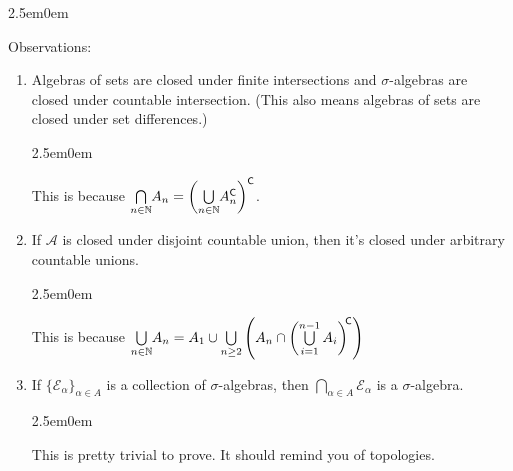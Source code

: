\documentclass{book}
\newcommand{\hTwo}{%
\color{MidnightBlue}%
   \fontsize{13}{15}\selectfont%
}
\newcommand{\hThree}{%
   \color{PineGreen!85!Orange}
   \fontsize{12}{14}\selectfont%
}
\newcommand{\exOne}{%
   \color{Purple}%
   \fontsize{13}{15}\selectfont%
}
\newenvironment{myIndent}{%
   \begin{adjustwidth}{2.5em}{0em}%
}{%
   \end{adjustwidth}%
}
\newcommand{\comp}{\mathsf{C}}
\newcommand{\retTwo}{\hfill\bigbreak}
\begin{document}
\begin{myIndent}\hTwo
   Observations:
   \begin{enumerate}
      \item Algebras of sets are closed under finite intersections and $\sigma$-algebras are\\ closed under countable intersection. (This also means algebras of sets are closed under set differences.)
      
      \begin{myIndent}\hThree
         This is because $\bigcap\limits_{n \in \mathbb{N}}\hspace{-0.2em}A_n = \left(\bigcup\limits_{n \in \mathbb{N}}\hspace{-0.2em}A_n^\comp\right)^\comp$\hspace{-0.4em}.
      \end{myIndent}

      \item If $\mathcal{A}$ is closed under disjoint countable union, then it's closed under arbitrary countable unions.
      
      \begin{myIndent}\hThree
         This is because $\bigcup\limits_{n \in \mathbb{N}}\hspace{-0.2em}A_n = A_1 \cup \bigcup\limits_{n \geq 2}\left(A_n \cap \left(\bigcup\limits_{i = 1}^{n-1} A_i\right)^{\hspace{-0.2em}\comp}\right)$
      \end{myIndent}

      \item If $\{\mathcal{E}_\alpha\}_{\alpha \in A}$ is a collection of $\sigma$-algebras, then $\bigcap\limits_{\alpha \in A}\mathcal{E}_\alpha$ is a $\sigma$-algebra.
      
      \begin{myIndent}\hThree
         This is pretty trivial to prove. It should remind you of topologies.\retTwo 
      \end{myIndent}
   \end{enumerate}
\end{myIndent}

\exOne
\end{document}
